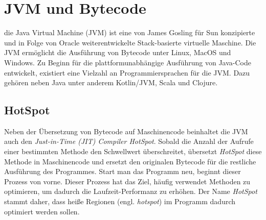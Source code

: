 \chapter{JVM und Bytecode}
\label{cha:jvm}

die Java Virtual Machine (JVM) ist eine von James Gosling für Sun konzipierte und in Folge von Oracle weiterentwickelte Stack-basierte virtuelle Maschine. Die JVM ermöglicht die Ausführung von Bytecode unter Linux, MacOS und Windows. Zu Beginn für die plattformunabhängige Ausführung von Java-Code entwickelt, existiert eine Vielzahl an Programmiersprachen für die JVM. Dazu gehören neben Java unter anderem Kotlin/JVM, Scala und Clojure.

\section{HotSpot}

Neben der Übersetzung von Bytecode auf Maschinencode beinhaltet die JVM auch den \textit{Just-in-Time (JIT) Compiler HotSpot}. Sobald die Anzahl der Aufrufe einer bestimmten Methode den Schwellwert überschreitet, übersetzt \textit{HotSpot} diese Methode in Maschinencode und ersetzt den originalen Bytecode für die restliche Ausführung des Programmes. Start man das Programm neu, beginnt dieser Prozess von vorne. Dieser Prozess hat das Ziel, häufig verwendet Methoden zu optimieren, um dadurch die Laufzeit-Performanz zu erhöhen. Der Name \textit{HotSpot} stammt daher, dass heiße Regionen (engl. \textit{hotspot}) im Programm dadurch optimiert werden sollen.

